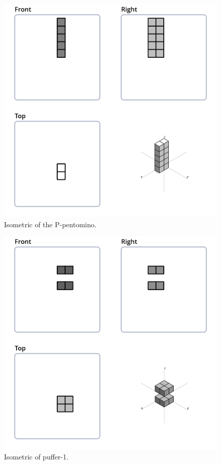 \begin{figure}
	\centering
	\includegraphics[scale=0.3]{iso_diagrams/o.png}
	\caption{Isometric of the P-pentomino.}
  \label{fig:iso-pent-p}
\end{figure}

\begin{figure}
	\centering
	\includegraphics[scale=0.3]{iso_settings/puffer_1.png}
	\caption{Isometric of puffer-1.}
  \label{fig:iso-puffer-1}
\end{figure}

